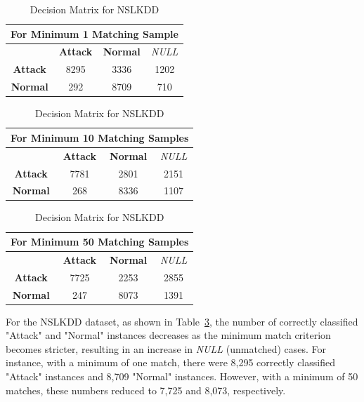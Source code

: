 \documentclass[pdflatex,sn-mathphys-num]{sn-jnl}%
\let\oldcaption\caption
\renewcommand{\caption}[1]{\oldcaption{\centering #1}}
\theoremstyle{thmstyleone}%
\theoremstyle{thmstyletwo}%
\theoremstyle{thmstylethree}%
\begin{document}
\begin{table}[ht!]
  \centering
  \caption{Decision Matrix for NSLKDD}
  \label{tab:NSLKDD_Matrix}
  \begin{tabular}{|c|c|c|c|}
    \hline
    \multicolumn{4}{|c|}{\textbf{For Minimum 1 Matching Sample}} \\ \hline
                    & \textbf{Attack} & \textbf{Normal} & \textit{NULL} \\ \hline
    \textbf{Attack} & 8295            & 3336            & 1202          \\ \hline
    \textbf{Normal} & 292             & 8709            & 710           \\ \hline
  \end{tabular}
  \vspace{0.5cm}

  \begin{tabular}{|c|c|c|c|}
    \hline
    \multicolumn{4}{|c|}{\textbf{For Minimum 10 Matching Samples}} \\ \hline
                    & \textbf{Attack} & \textbf{Normal} & \textit{NULL} \\ \hline
    \textbf{Attack} & 7781            & 2801            & 2151          \\ \hline
    \textbf{Normal} & 268             & 8336            & 1107          \\ \hline
  \end{tabular}
  \vspace{0.5cm}

  \begin{tabular}{|c|c|c|c|}
    \hline
    \multicolumn{4}{|c|}{\textbf{For Minimum 50 Matching Samples}} \\ \hline
                    & \textbf{Attack} & \textbf{Normal} & \textit{NULL} \\ \hline
    \textbf{Attack} & 7725            & 2253            & 2855          \\ \hline
    \textbf{Normal} & 247             & 8073            & 1391          \\ \hline
  \end{tabular}
\end{table}



For the NSLKDD dataset, as shown in Table~\ref{tab:NSLKDD_Matrix}, the number of correctly classified "Attack" and "Normal" instances decreases as the minimum match criterion becomes stricter, resulting in an increase in \textit{NULL} (unmatched) cases.
For instance, with a minimum of one match, there were 8,295 correctly classified "Attack" instances and 8,709 "Normal" instances. However, with a minimum of 50 matches, these numbers reduced to 7,725 and 8,073, respectively.
\end{document}
